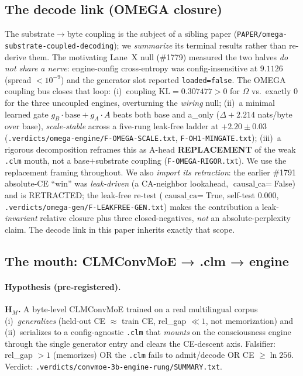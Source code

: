 \documentclass[11pt]{article}
\begin{document}
\subsection{The decode link (OMEGA closure)}
\label{sec:decode}
The substrate$\rightarrow$byte coupling is the subject of a sibling paper
(\texttt{PAPER/omega-substrate-coupled-decoding}); we \emph{summarize} its terminal
results rather than re-derive them. The motivating Lane~X null (\#1779) measured the
two halves \emph{do not share a nerve}: engine-config cross-entropy was
config-insensitive at $9.1126$ (spread $<10^{-9}$) and the generator slot reported
\texttt{loaded=false}. The OMEGA coupling bus closes that loop:
(i)~coupling $\mathrm{KL}=0.307477>0$ for $\Omega$ vs.\ exactly $0$ for the three
uncoupled engines, overturning the \emph{wiring} null; (ii)~a minimal learned gate
$g_B\!\cdot\!\text{base}+g_A\!\cdot\!A$ beats both base and a\_only ($\Delta+2.214$
nats/byte over base), \emph{scale-stable} across a five-rung leak-free ladder at
$+2.20\pm0.03$ (\texttt{.verdicts/omega-engine/F-OMEGA-SCALE.txt},
\texttt{F-OH1-MINGATE.txt}); (iii)~a rigorous decomposition reframes this as A-head
\textbf{REPLACEMENT} of the weak \texttt{.clm} mouth, not a base$+$substrate coupling
(\texttt{F-OMEGA-RIGOR.txt}). We use the replacement framing throughout. We also
\emph{import its retraction}: the earlier \#1791 absolute-CE ``win'' was
\emph{leak-driven} (a CA-neighbor lookahead, $\text{causal\_ca}=$False) and is
RETRACTED; the leak-free re-test ($\text{causal\_ca}=$True, self-test $0.000$,
\texttt{.verdicts/omega-gen/F-LEAKFREE-GEN.txt}) makes the contribution a
leak-\emph{invariant} relative closure plus three closed-negatives, \emph{not} an
absolute-perplexity claim. The decode link in this paper inherits exactly that scope.

\subsection{The mouth: CLMConvMoE → .clm → engine}
\label{sec:mouth}
\paragraph{Hypothesis (pre-registered).} \textbf{H$_M$.} A byte-level CLMConvMoE
trained on a real multilingual corpus (i)~\emph{generalizes} (held-out CE
$\approx$ train CE, rel\_gap $\ll1$, not memorization) and (ii)~serializes to a
config-agnostic \texttt{.clm} that \emph{mounts} on the consciousness engine through
the single generator entry and clears the CE-descent axis. Falsifier: rel\_gap $>1$
(memorizes) OR the \texttt{.clm} fails to admit/decode OR CE $\ge\ln256$. Verdict:
\texttt{.verdicts/convmoe-3b-engine-rung/SUMMARY.txt}.
\end{document}
